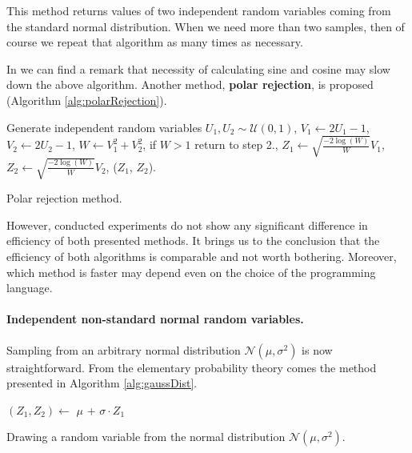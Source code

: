 \documentclass[a4paper,11pt, twoside]{book}
\theoremstyle{definition}
\theoremstyle{remark}
\begin{document}
This method returns values of two independent random variables coming from the standard normal distribution. When we need more than two samples, then of course we repeat that algorithm as many times as necessary.

In \cite{london} we can find a remark that necessity of calculating sine and cosine may slow down the above algorithm. Another method, \textbf{polar rejection}, is proposed (Algorithm \ref{alg:polarRejection}).
\begin{algorithm}[!ht]
 \begin{algorithmic}[1]
    \State Generate independent random variables $U_1, U_2 \sim \mathcal{U}(0,1)$,
    \State $V_1 \gets 2U_1-1$,
    \State $V_2 \gets 2U_2-1$,
    \State $W \gets V_1^2 + V_2^2$,
    \State if $W > 1$ return to step 2.,
    \State $Z_1 \gets \sqrt{\frac{-2\log(W)}{W}} V_1$,
    \State $Z_2 \gets \sqrt{\frac{-2\log(W)}{W}} V_2$,
    \State \Return ($Z_1$, $Z_2$).
  \EndFunction
 \end{algorithmic}
 \caption{Polar rejection method.}
 \label{alg:polarRejection}
\end{algorithm}
However, conducted experiments do not show any significant difference in efficiency of both presented methods. It brings us to the conclusion that the efficiency of both algorithms is comparable and not worth bothering. Moreover, which method is faster may depend even on the choice of the programming language.

\paragraph{Independent non-standard normal random variables.} Sampling from an arbitrary normal distribution $\mathcal{N}(\mu, \sigma^2)$ is now straightforward. From the elementary probability theory comes the method presented in Algorithm \ref{alg:gaussDist}.
\begin{algorithm}[!ht]
 \begin{algorithmic}[1]
    \State $(Z_1, Z_2) \gets $ 
    \State \Return $\mu$ + $\sigma \cdot Z_1$
  \EndFunction
 \end{algorithmic}
 \caption{Drawing a random variable from the normal distribution $\mathcal{N}(\mu, \sigma^2)$.}
 \label{alg:gaussDist}
\end{algorithm}
\end{document}
